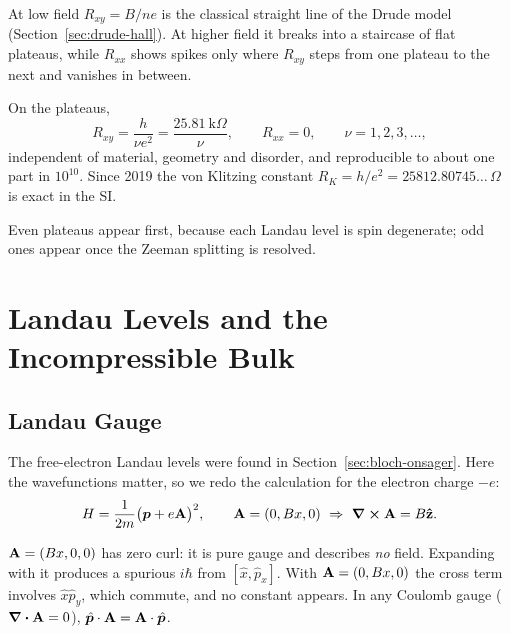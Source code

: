 At low field $R_{xy} = B/ne$ is the classical straight line of the Drude model (Section~\ref{sec:drude-hall}). At higher field it breaks into a staircase of flat plateaus, while $R_{xx}$ shows spikes only where $R_{xy}$ steps from one plateau to the next and vanishes in between.

\begin{fact}
On the plateaus,
\begin{equation}
    R_{xy} = \frac{h}{\nu e^2} = \frac{25.81\ \text{k}\Omega}{\nu},
    \qquad
    R_{xx} = 0,
    \qquad
    \nu = 1,2,3,\ldots,
\end{equation}
independent of material, geometry and disorder, and reproducible to about one part in $10^{10}$. Since 2019 the von Klitzing constant $R_K = h/e^2 = 25812.80745\ldots\,\Omega$ is exact in the SI.
\end{fact}

Even plateaus appear first, because each Landau level is spin degenerate; odd ones appear once the Zeeman splitting is resolved.

\section{Landau Levels and the Incompressible Bulk}

\subsection{Landau Gauge}

The free-electron Landau levels were found in Section~\ref{sec:bloch-onsager}. Here the wavefunctions matter, so we redo the calculation for the electron charge $-e$:
\begin{equation}
    H = \frac{1}{2m}\bigl(\lvect{p} + e\cvect{A}\bigr)^2,
    \qquad
    \cvect{A} = (0, Bx, 0)\ \Rightarrow\ \curl\cvect{A} = B\uvect{z}.
\end{equation}

\begin{fact}
$\cvect{A} = (Bx,0,0)$ has zero curl: it is pure gauge and describes \emph{no} field. Expanding with it produces a spurious $i\hbar$ from $[\hat{x},\hat{p}_x]$. With $\cvect{A} = (0,Bx,0)$ the cross term involves $\hat{x}\hat{p}_y$, which commute, and no constant appears. In any Coulomb gauge ($\div\cvect{A} = 0$), $\hat{\lvect{p}}\cdot\cvect{A} = \cvect{A}\cdot\hat{\lvect{p}}$.
\end{fact}

